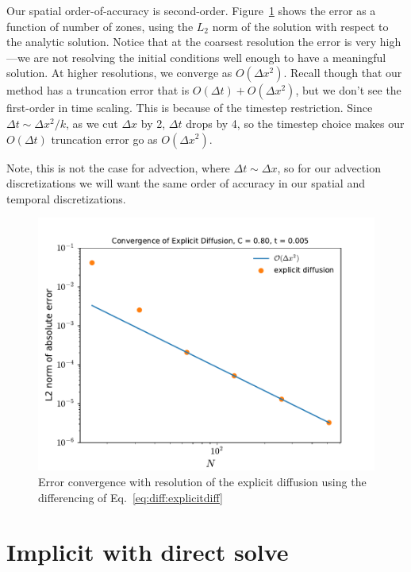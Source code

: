 Our spatial order-of-accuracy is second-order.
Figure~\ref{fig:diffexplicit_converge} shows the error as a function
of number of zones, using the $L_2$ norm of the solution with respect
to the analytic solution.  Notice that at the coarsest resolution the
error is very high---we are not resolving the initial conditions well
enough to have a meaningful solution.  At higher resolutions, we
converge as $O(\Delta x^2)$.  Recall though that our method has a
truncation error that is $O(\Delta t) + O(\Delta x^2)$, but we don't
see the first-order in time scaling.  This is because of the timestep
restriction.  Since $\Delta t \sim \Delta x^2/k$, as we cut $\Delta x$
by 2, $\Delta t$ drops by 4, so the timestep choice makes our
$O(\Delta t)$ truncation error go as $O(\Delta x^2)$.

Note, this is not the case for advection, where $\Delta t \sim \Delta x$, so
for our advection discretizations we will want the same order of accuracy
in our spatial and temporal discretizations.

\begin{figure}
\centering
\includegraphics[width=\linewidth]{diffexplicit-converge-0_8}
\caption[Error convergence of explicit diffusion]{\label{fig:diffexplicit_converge}
Error convergence with resolution of the explicit diffusion using the differencing of 
Eq.~\ref{eq:diff:explicitdiff}
 \\ }
\end{figure}

\section{Implicit with direct solve}

